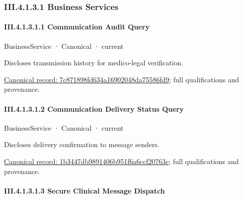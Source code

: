 \subsubsection*{III.4.1.3.1 Business Services}
\label{navigation:III.4.1.3.1}

\paragraph*{III.4.1.3.1.1 Communication Audit Query}
\label{navigation:III.4.1.3.1.1}

\label{element:7c871898fd634a16902048da75586fd9}
{\small BusinessService · Canonical · current}\par

Discloses transmission history for medico-legal verification.


{\footnotesize \href{../../../../../../../continuum/business/business-service/7c871898fd634a16902048da75586fd9.md}{Canonical record: 7c871898fd634a16902048da75586fd9}; full qualifications and provenance.}\par
\paragraph*{III.4.1.3.1.2 Communication Delivery Status Query}
\label{navigation:III.4.1.3.1.2}

\label{element:1b3447db9891406b951f6a6ccf20763e}
{\small BusinessService · Canonical · current}\par

Discloses delivery confirmation to message senders.


{\footnotesize \href{../../../../../../../continuum/business/business-service/1b3447db9891406b951f6a6ccf20763e.md}{Canonical record: 1b3447db9891406b951f6a6ccf20763e}; full qualifications and provenance.}\par
\paragraph*{III.4.1.3.1.3 Secure Clinical Message Dispatch}
\label{navigation:III.4.1.3.1.3}

